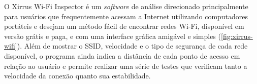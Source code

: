 \begin{figure}[H]
	\centering
\end{figure}

\label{subsubsubsec:xirrus-wifi}

O Xirrus Wi-Fi Inspector é um \textit{software} de análise direcionado principalmente para usuários que frequentemente acessam a Internet utilizando computadores portáteis e desejam um método fácil de encontrar redes Wi-Fi, disponível em versão grátis e paga, e com uma interface gráfica amigável e simples (\autoref{fig:xirrus-wifi}). Além de mostrar o SSID, velocidade e o tipo de segurança de cada rede disponível, o programa ainda indica a distância de cada ponto de acesso em relação ao usuário e permite realizar uma série de testes que verificam tanto a velocidade da conexão quanto sua estabilidade.

\begin{figure}[H]
	\centering
\end{figure}